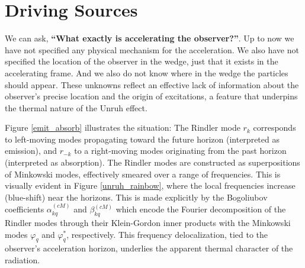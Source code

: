 \documentclass[12pt,a4paper]{article}
\begin{document}
\section{Driving Sources}

We can ask, {\bf ``What exactly is accelerating the observer?''}. Up to now we have not specified any physical mechanism for the acceleration.  We also have not specified the location of the observer in the wedge, just that it exists in the accelerating frame.  And we also do not know where in the wedge the particles should appear. These unknowns reflect an effective lack of information about the observer’s precise location and the origin of excitations, a feature that underpins the thermal nature of the Unruh effect.

Figure \ref{emit_absorb} illustrates the situation: The Rindler mode $r_k$ corresponds to left-moving modes propagating toward the future horizon (interpreted as emission), and $r_{-k}$ to a right-moving modes originating from the past horizon (interpreted as absorption). The Rindler modes are constructed as superpositions of Minkowski modes, effectively smeared over a range of frequencies. This is visually evident in Figure \ref{unruh_rainbow}, where the local frequencies increase (blue-shift) near the horizons. This is made explicitly by the Bogoliubov coefficients $\alpha_{kq}^{(cM)}$ and $\beta_{kq}^{(cM)}$ which encode the Fourier decomposition of the Rindler modes through their Klein-Gordon inner products with the Minkowski modes $\varphi_q$ and $\varphi_q^*$, respectively. This frequency delocalization, tied to the observer's acceleration horizon, underlies the apparent thermal character of the radiation.
\end{document}
